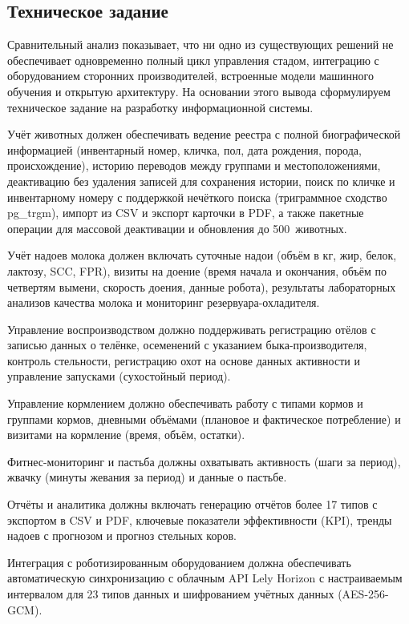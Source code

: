 \subsection{Техническое задание}

Сравнительный анализ показывает, что ни одно из существующих решений не обеспечивает одновременно полный цикл управления стадом, интеграцию с оборудованием сторонних производителей, встроенные модели машинного обучения и открытую архитектуру. На основании этого вывода сформулируем техническое задание на разработку информационной системы.

Учёт животных должен обеспечивать ведение реестра с полной биографической информацией (инвентарный номер, кличка, пол, дата рождения, порода, происхождение), историю переводов между группами и местоположениями, деактивацию без удаления записей для сохранения истории, поиск по кличке и инвентарному номеру с поддержкой нечёткого поиска (триграммное сходство pg\_trgm), импорт из CSV и экспорт карточки в PDF, а также пакетные операции для массовой деактивации и обновления до 500~животных.

Учёт надоев молока должен включать суточные надои (объём в кг, жир, белок, лактозу, SCC, FPR), визиты на доение (время начала и окончания, объём по четвертям вымени, скорость доения, данные робота), результаты лабораторных анализов качества молока и мониторинг резервуара-охладителя.

Управление воспроизводством должно поддерживать регистрацию отёлов с записью данных о телёнке, осеменений с указанием быка-производителя, контроль стельности, регистрацию охот на основе данных активности и управление запусками (сухостойный период).

Управление кормлением должно обеспечивать работу с типами кормов и группами кормов, дневными объёмами (плановое и фактическое потребление) и визитами на кормление (время, объём, остатки).

Фитнес-мониторинг и пастьба должны охватывать активность (шаги за период), жвачку (минуты жевания за период) и данные о пастьбе.

Отчёты и аналитика должны включать генерацию отчётов более 17 типов с экспортом в CSV и PDF, ключевые показатели эффективности (KPI), тренды надоев с прогнозом и прогноз стельных коров.

Интеграция с роботизированным оборудованием должна обеспечивать автоматическую синхронизацию с облачным API Lely Horizon с настраиваемым интервалом для 23 типов данных и шифрованием учётных данных (AES-256-GCM).

